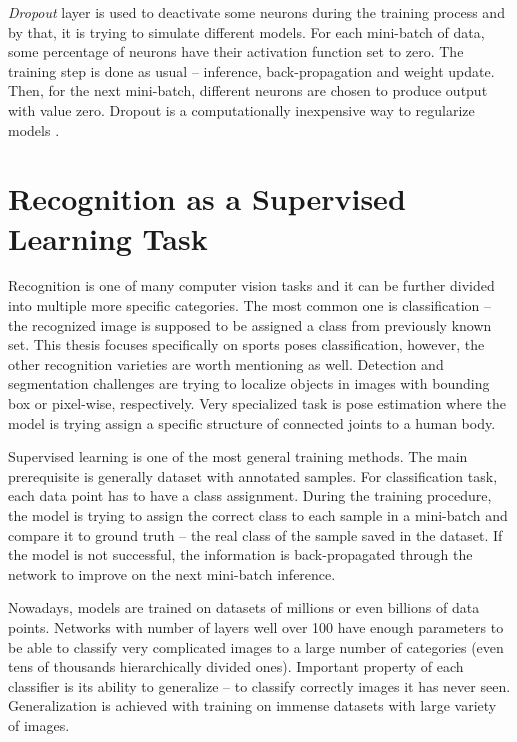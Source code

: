 \textit{Dropout} layer is used to deactivate some neurons during the training process and by that, it is trying to simulate different models. For each mini-batch of data, some percentage of neurons have their activation function set to zero. The training step is done as usual -- inference, back-propagation and weight update. Then, for the next mini-batch, different neurons are chosen to produce output with value zero. Dropout is a computationally inexpensive way to regularize models \cite{Goodfellow-et-al-2016}.



\section{\label{sec:supervised}Recognition as a Supervised Learning Task}

Recognition is one of many computer vision tasks and it can be further divided into multiple more specific categories. The most common one is classification -- the recognized image is supposed to be assigned a class from previously known set. This thesis focuses specifically on sports poses classification, however, the other recognition varieties are worth mentioning as well. Detection and segmentation challenges are trying to localize objects in images with bounding box or pixel-wise, respectively. Very specialized task is pose estimation where the model is trying assign a specific structure of connected joints to a human body.

Supervised learning is one of the most general training methods. The main prerequisite is generally dataset with annotated samples. For classification task, each data point has to have a class assignment. During the training procedure, the model is trying to assign the correct class to each sample in a mini-batch and compare it to ground truth -- the real class of the sample saved in the dataset. If the model is not successful, the information is back-propagated through the network to improve on the next mini-batch inference.

Nowadays, models are trained on datasets of millions or even billions of data points. Networks with number of layers well over 100 have enough parameters to be able to classify very complicated images to a large number of categories (even tens of thousands hierarchically divided ones). Important property of each classifier is its ability to generalize -- to classify correctly images it has never seen. Generalization is achieved with training on immense datasets with large variety of images.

